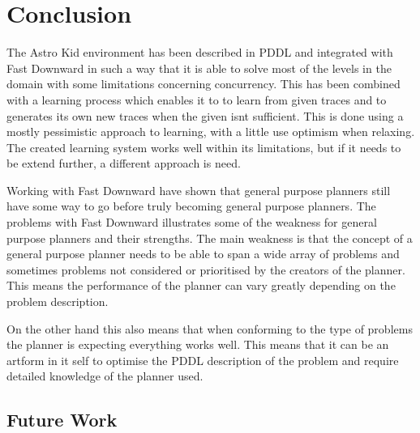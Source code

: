 \chapter{Conclusion}

The Astro Kid environment has been described in PDDL and integrated with Fast Downward in such a way that it is able to solve most of the levels in the domain with some limitations concerning concurrency. This has been combined with a learning process which enables it to to learn from given traces and to generates its own new traces when the given isnt sufficient. This is done using a mostly pessimistic approach to learning, with a little use optimism when relaxing. The created learning system works well within its limitations, but if it needs to be extend further, a different approach is need.


Working with Fast Downward have shown that general purpose planners still have some way to go before truly becoming general purpose planners. The problems with Fast Downward illustrates some of the weakness for general purpose planners and their strengths. The main weakness is that the concept of a general purpose planner needs to be able to span a wide array of problems and sometimes problems not considered or prioritised by the creators of the planner. This means the performance of the planner can vary greatly depending on the problem description.

 
On the other hand this also means that when conforming to the type of problems the planner is expecting everything works well. This means that it can be an artform in it self to optimise the PDDL description of the problem and require detailed knowledge of the planner used.
 
 
 
 

 
 
\section{Future Work}

